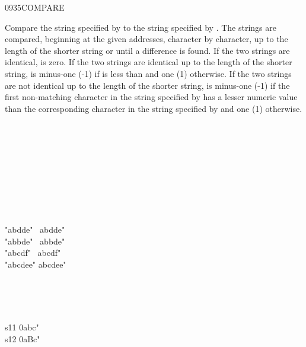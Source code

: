 \begin{worddef}{0935}{COMPARE}
\item {}

	Compare the string specified by  to the
	string specified by . The strings are
	compared, beginning at the given addresses, character by
	character, up to the length of the shorter string or until a
	difference is found. If the two strings are identical, 
	is zero. If the two strings are identical up to the length of
	the shorter string,  is minus-one (-1) if 
	is less than  and one (1) otherwise. If the two
	strings are not identical up to the length of the shorter string,
	 is minus-one (-1) if the first non-matching character
	in the string specified by  has a lesser
	numeric value than the corresponding character in the string
	specified by  and one (1) otherwise.

	\begin{testing}\ttfamily
		 \\
		 \tab {}  \\
		 \\
		 \\
		 \\
		 \\
		 \\
		 \\

		\word{:} "abdde"~  abdde"~ \word{;} \\
		\word{:} "abbde"~  abbde"~ \word{;} \\
		\word{:} "abcdf"~  abcdf"~ \word{;} \\
		\word{:} "abcdee"  abcdee" \word{;}

		 \\
		 \\
		 \\

		\word{:} s11  0abc" \word{;} \\
		\word{:} s12  0aBc" \word{;}

		 \\
	\end{testing}
\end{worddef}


